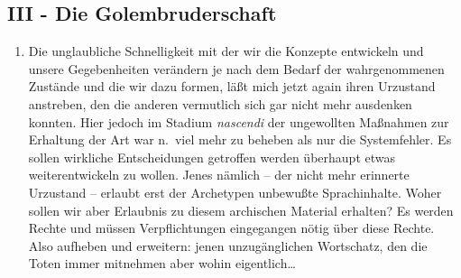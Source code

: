 \documentclass[
]{article}
\author{}
\date{\vspace{-2.5em}}
\providecommand{\tightlist}{%
  \setlength{\itemsep}{0pt}\setlength{\parskip}{0pt}}
\begin{document}
\subsection{III - Die
Golembruderschaft}\label{iii---die-golembruderschaft}

\begin{enumerate}
\def\labelenumi{\arabic{enumi}.}
\setcounter{enumi}{6}
\tightlist
\item
  Die unglaubliche Schnelligkeit mit der wir die Konzepte entwickeln und
  unsere Gegebenheiten verändern je nach dem Bedarf der wahrgenommenen
  Zustände und die wir dazu formen, läßt mich jetzt again ihren
  Urzustand anstreben, den die anderen vermutlich sich gar nicht mehr
  ausdenken konnten. Hier jedoch im Stadium \emph{nascendi} der
  ungewollten Maßnahmen zur Erhaltung der Art war n.~viel mehr zu
  beheben als nur die Systemfehler. Es sollen wirkliche Entscheidungen
  getroffen werden überhaupt etwas weiterentwickeln zu wollen. Jenes
  nämlich -- der nicht mehr erinnerte Urzustand -- erlaubt erst der
  Archetypen unbewußte Sprachinhalte. Woher sollen wir aber Erlaubnis zu
  diesem archischen Material erhalten? Es werden Rechte und müssen
  Verpflichtungen eingegangen nötig über diese Rechte. Also aufheben und
  erweitern: jenen unzugänglichen Wortschatz, den die Toten immer
  mitnehmen aber wohin eigentlich\ldots{}
\end{enumerate}
\end{document}
